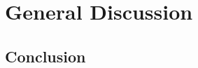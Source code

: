 \documentclass[dwyatte_dissertation.tex]{subfiles}
\begin{document}
\chapter{General Discussion}

\section{}


\section{Conclusion}



\end{document}
